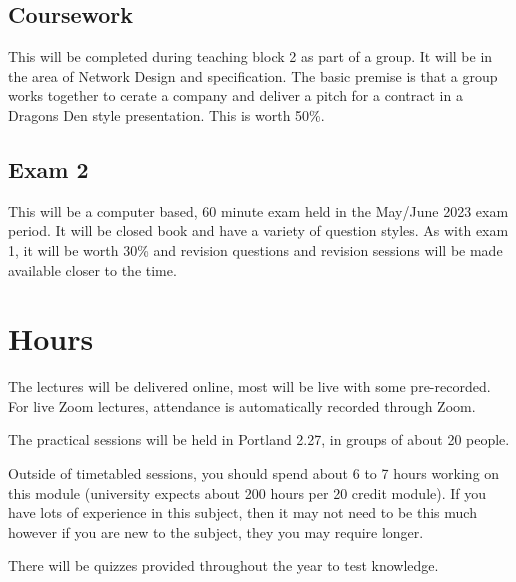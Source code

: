 \subsection*{Coursework}
This will be completed during teaching block 2 as part of a group. It will be in the area of Network Design and specification. The basic premise is that a group works together to cerate a company and deliver a pitch for a contract in a Dragons Den style presentation. This is worth 50\%. 
\subsection*{Exam 2}
This will be a computer based, 60 minute exam held in the May/June 2023 exam period. It will be closed book and have a variety of question styles. As with exam 1, it will be worth 30\% and revision questions and revision sessions will be made available closer to the time. 

\section*{Hours}
The lectures will be delivered online, most will be live with some pre-recorded. For live Zoom lectures, attendance is automatically recorded through Zoom.

The practical sessions will be held in Portland 2.27, in groups of about 20 people.

Outside of timetabled sessions, you should spend about 6 to 7 hours working on this module (university expects about 200 hours per 20 credit module). If you have lots of experience in this subject, then it may not need to be this much however if you are new to the subject, they you may require longer.

There will be quizzes provided throughout the year to test knowledge. 

